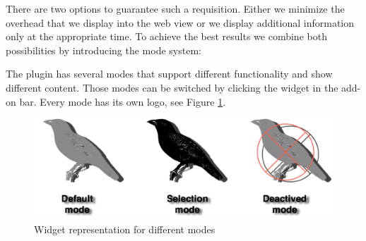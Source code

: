 There are two options to guarantee such a requisition. Either we minimize the overhead that we display into the web view or we display additional information only at the appropriate time. To achieve the best results we combine both possibilities by introducing the mode system:

The plugin has several modes that support different functionality and show different content. Those modes can be switched by clicking the widget in the add-on bar. Every mode has its own logo, see Figure \ref{mode-logos}. 

\begin{figure}\centering
		\includegraphics[width=13cm]{images/mode-logos.png}
		\caption{Widget representation for different modes}
		\label{mode-logos}
\end{figure} 


